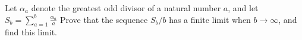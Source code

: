 Let $\alpha_a$ denote the greatest odd divisor of a natural number $a$, and let $S_b=\sum_{a=1}^b\frac{\alpha_a}a$ Prove that the sequence $S_b/b$ has a finite limit when $b\to\infty$, and find this limit.